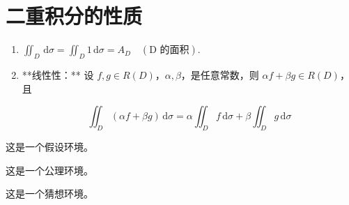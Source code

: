 \documentclass[lang = zh , final , oneside , openany , titlepage , zihao = -4 , linespread = 1.3 , baselineskip = false , cjk-font = windows , text-font = newtx , math-font = newtx]{sjtureport}
\begin{document}
\section{二重积分的性质}

\begin{enumerate}
    \item $\displaystyle\iint_D\,\mathrm{d}\sigma = \iint_D 1\,\mathrm{d}\sigma = A_D \quad\left(\text{D 的面积}\right)$.
    \item **线性性：** 设 $f,g\in R(D)$，$\alpha , \beta$，是任意常数，则 $\alpha f +\beta g \in R(D)$，且

    $$
    \iint_D (\alpha f +\beta g)\,\mathrm{d}\sigma = \alpha \iint_D f\,\mathrm{d}\sigma + \beta \iint_D g\,\mathrm{d}\sigma
    $$
\end{enumerate}

\begin{assumption}
    这是一个假设环境。
\end{assumption}

\begin{axiom}
    这是一个公理环境。
\end{axiom}

\begin{conjecture}
    这是一个猜想环境。
\end{conjecture}

\nocite{*}

\end{document}
